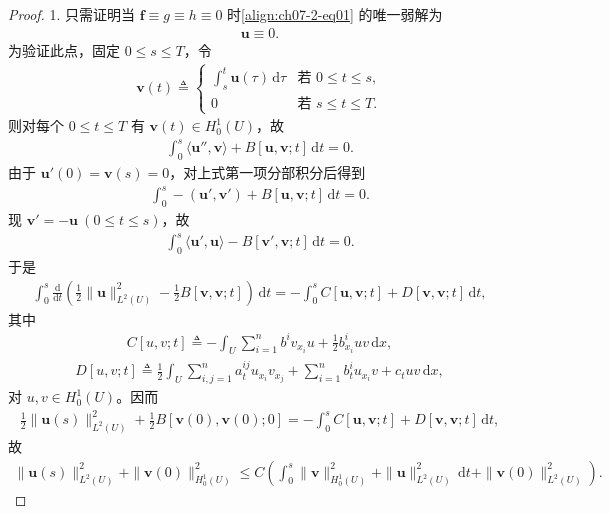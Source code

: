 \documentclass[../../main.tex]{subfiles}
\begin{document}
\begin{proof}
1. 只需证明当 $\mathbf{f}\equiv g\equiv h\equiv 0$ 时\eqref{align:ch07-2-eq01} 的唯一弱解为
\begin{align}
\mathbf{u}\equiv 0.\label{align:ch07-2-eq38}
\end{align}
为验证此点，固定 $0\leqslant s\leqslant T$，令
\begin{align*}
\mathbf{v}(t)\triangleq
\begin{cases}
\displaystyle\int_s^t \mathbf{u}(\tau)\,\mathrm{d}\tau & \text{若 } 0\leqslant t\leqslant s,\\
0 & \text{若 } s\leqslant t\leqslant T.
\end{cases}
\end{align*}
则对每个 $0\leqslant t\leqslant T$ 有 $\mathbf{v}(t)\in H^1_0(U)$，故
\begin{align*}
\int_0^s \langle\mathbf{u}'',\mathbf{v}\rangle+B[\mathbf{u},\mathbf{v};t]\,\mathrm{d}t=0.
\end{align*}
由于 $\mathbf{u}'(0)=\mathbf{v}(s)=0$，对上式第一项分部积分后得到
\begin{align}
\int_0^s -(\mathbf{u}',\mathbf{v}')+B[\mathbf{u},\mathbf{v};t]\,\mathrm{d}t=0.\label{align:ch07-2-eq39}
\end{align}
现 $\mathbf{v}'=-\mathbf{u}\ (0\leqslant t\leqslant s)$，故
\begin{align*}
\int_0^s \langle\mathbf{u}',\mathbf{u}\rangle-B[\mathbf{v}',\mathbf{v};t]\,\mathrm{d}t=0.
\end{align*}
于是
\begin{align*}
\int_0^s \frac{\mathrm{d}}{\mathrm{d}t}\left(\frac12\|\mathbf{u}\|_{L^2(U)}^2-\frac12 B[\mathbf{v},\mathbf{v};t]\right)\,\mathrm{d}t = -\int_0^s C[\mathbf{u},\mathbf{v};t]+D[\mathbf{v},\mathbf{v};t]\,\mathrm{d}t,
\end{align*}
其中
\begin{align*}
C[u,v;t]\triangleq -\int_U \sum_{i=1}^n b^i v_{x_i}u + \frac12 b^i_{x_i}uv\,\mathrm{d}x,
\end{align*}
\begin{align*}
D[u,v;t]\triangleq \frac12\int_U \sum_{i,j=1}^n a_t^{ij}u_{x_i}v_{x_j}+\sum_{i=1}^n b_t^i u_{x_i}v+c_t uv\,\mathrm{d}x,
\end{align*}
对 $u,v\in H^1_0(U)$。因而
\begin{align*}
\frac12\|\mathbf{u}(s)\|_{L^2(U)}^2+\frac12 B[\mathbf{v}(0),\mathbf{v}(0);0] = -\int_0^s C[\mathbf{u},\mathbf{v};t]+D[\mathbf{v},\mathbf{v};t]\,\mathrm{d}t,
\end{align*}
故
\begin{align}
\|\mathbf{u}(s)\|_{L^2(U)}^2+\|\mathbf{v}(0)\|_{H^1_0(U)}^2
\leqslant C\left(\int_0^s \|\mathbf{v}\|_{H^1_0(U)}^2+\|\mathbf{u}\|_{L^2(U)}^2\,\mathrm{d}t+\|\mathbf{v}(0)\|_{L^2(U)}^2\right).\label{align:ch07-2-eq40}
\end{align}


\end{proof}
\end{document}
